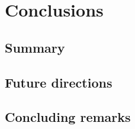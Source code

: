 
\chapter{Conclusions}
\label{sec:conclusion}

\section{Summary}

\section{Future directions}

\section{Concluding remarks}
